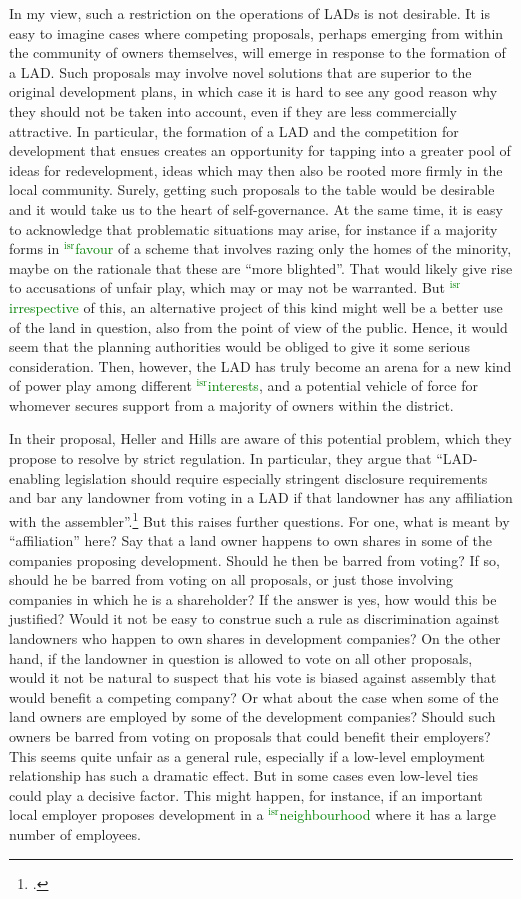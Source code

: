 \documentclass[12pt,a4paper]{book} %
\newcommand{\isr}[1]{\textcolor{green}{$^{\textrm{isr}}${#1}}}
\begin{document}
In my view, such a restriction on the operations of LADs is not desirable. It is easy to imagine cases where competing proposals, perhaps emerging from within the community of owners themselves, will emerge in response to the formation of a LAD. Such proposals may involve novel solutions that are superior to the original development plans, in which case it is hard to see any good reason why they should not be taken into account, even if they are less commercially attractive. In particular, the formation of a LAD and the competition for development that ensues creates an opportunity for tapping into a greater pool of ideas for redevelopment, ideas which may then also be rooted more firmly in the local community. Surely, getting such proposals to the table would be desirable and it would take us to the heart of self-governance. At the same time, it is easy to acknowledge that problematic situations may arise, for instance if a majority forms in \isr{favour} of a scheme that involves razing only the homes of the minority, maybe on the rationale that these are ``more blighted''. That would likely give rise to accusations of unfair play, which may or may not be warranted. But \isr{irrespective} of this, an alternative project of this kind might well be a better use of the land in question, also from the point of view of the public. Hence, it would seem that the planning authorities would be obliged to give it some serious consideration. Then, however, the LAD has truly become an arena for a new kind of power play among different \isr{interests}, and a potential vehicle of force for whomever secures support from a majority of owners within the district.

In their proposal, Heller and Hills are aware of this potential problem, which they propose to resolve by strict regulation. In particular, they argue that ``LAD-enabling legislation should require especially stringent disclosure requirements and bar any landowner from voting in a LAD if that landowner has any affiliation with the assembler''.\footcite{heller08} But this raises further questions. For one, what is meant by ``affiliation'' here? Say that a land owner happens to own shares in some of the companies proposing development. Should he then be barred from voting? If so, should he be barred from voting on all proposals, or just those involving companies in which he is a shareholder? If the answer is yes, how would this be justified? Would it not be easy to construe such a rule as discrimination against landowners who happen to own shares in development companies? On the other hand, if the landowner in question is allowed to vote on all other proposals, would it not be natural to suspect that his vote is biased against assembly that would benefit a competing company? Or what about the case when some of the land owners are employed by some of the development companies? Should such owners be barred from voting on proposals that could benefit their employers? This seems quite unfair as a general rule, especially if a low-level employment relationship has such a dramatic effect. But in some cases even low-level ties could play a decisive factor. This might happen, for instance, if an important local employer proposes development in a \isr{neighbourhood} where it has a large number of employees.
\end{document}
